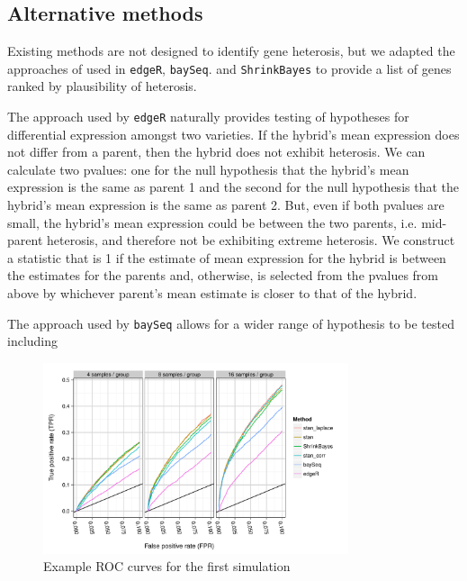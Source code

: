 \documentclass[useAMS,usenatbib,referee]{biom}
\begin{document}
\subsection{Alternative methods}

Existing methods are not designed to identify gene heterosis, but we adapted the approaches of used in {\tt edgeR}, {\tt baySeq}. and {\tt ShrinkBayes} to provide a list of genes ranked by plausibility of heterosis. 

The approach used by {\tt edgeR} naturally provides testing of hypotheses for differential expression amongst two varieties. If the hybrid's mean expression does not differ from a parent, then the hybrid does not exhibit heterosis. We can calculate two pvalues: one for the null hypothesis that the hybrid's mean expression is the same as parent 1 and the second for the null hypothesis that the hybrid's mean expression is the same as parent 2. But, even if both pvalues are small, the hybrid's mean expression could be between the two parents, i.e. mid-parent heterosis, and therefore not be exhibiting extreme heterosis. We construct a statistic that is 1 if the estimate of mean expression 
for the hybrid is between the estimates for the parents and, otherwise, is selected from the pvalues from above by whichever parent's mean estimate is closer to that of the hybrid. 

The approach used by {\tt baySeq} allows for a wider range of hypothesis to be tested including 



\begin{figure}[htbp]
\centerline{\includegraphics[width=0.8\textwidth]{exampleROC0_1}}
\caption{Example ROC curves for the first simulation}
\label{f:roc}
\end{figure}
\end{document}
